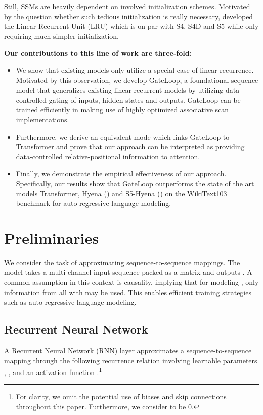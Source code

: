\documentclass{article} \usepackage{iclr2024_conference,times}
\begin{document}
Still, SSMs are heavily dependent on involved initialization schemes. Motivated by the question whether such tedious initialization is really necessary, \cite{orvieto2023resurrecting} developed the Linear Recurrent Unit (LRU) which is on par with S4, S4D and S5 while only requiring much simpler initialization. 

\textbf{Our contributions to this line of work are three-fold:}
\vspace{0.2cm}
\begin{itemize}[noitemsep, itemsep=0.2cm, topsep=0pt]
  \item We show that existing models only utilize a special case of linear recurrence. Motivated by this observation, we develop GateLoop, a foundational sequence model that generalizes existing linear recurrent models by utilizing data-controlled gating of inputs, hidden states and outputs. GateLoop can be trained efficiently in  making use of highly optimized associative scan implementations. 
  \item Furthermore, we derive an equivalent  mode which links GateLoop to Transformer and prove that our approach can be interpreted as providing data-controlled relative-positional information to attention. 
  \item Finally, we demonstrate the empirical effectiveness of our approach. Specifically, our results show that GateLoop outperforms the state of the art models Transformer, Hyena (\cite{poli2023hyena}) and S5-Hyena (\cite{smith2023github}) on the WikiText103 benchmark for auto-regressive language modeling.
\end{itemize}

\section{Preliminaries}
We consider the task of approximating sequence-to-sequence mappings. The model takes a multi-channel input sequence  packed as a matrix  and outputs . A common assumption in this context is causality, implying that for modeling , only information from all  with  may be used. This enables efficient training strategies such as auto-regressive language modeling. 

\newpage

\subsection{Recurrent Neural Network}
A Recurrent Neural Network (RNN) layer approximates a sequence-to-sequence mapping through the following recurrence relation involving learnable parameters , ,  and an activation function .\footnote{For clarity, we omit the potential use of biases and skip connections throughout this paper. Furthermore, we consider  to be 0.} 
\end{document}
